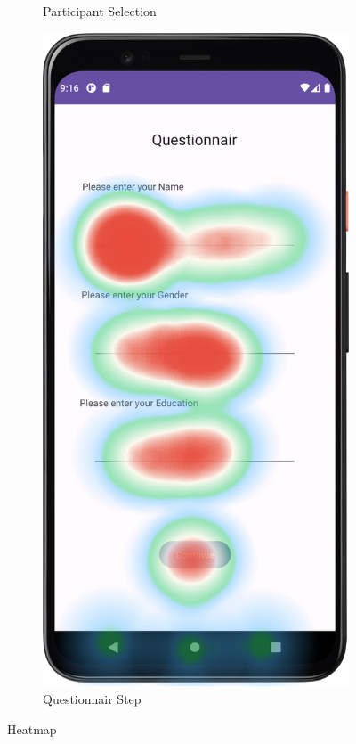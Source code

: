 \begin{figure}[htbp]
\begin{subfigure}[b]{0.25\textwidth}
        \caption{Participant Selection}
        \label{subfig:heatmapB}
    \end{subfigure}
        \hspace{1cm}
    \begin{subfigure}[b]{0.25\textwidth}
        \centering
        \includegraphics[width=\textwidth]{content/07_evaluation_of_the_solution/HeatMap_QuestionnairScreen.png}
        \caption{Questionnair Step}
        \label{subfig:heatmapC}
    \end{subfigure}
       \caption*{Heatmap}
       \label{fig:heatmaps}
\end{figure}

